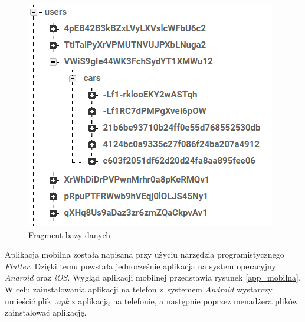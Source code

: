 \documentclass[12pt]{article}
\begin{document}
	\begin{figure}[H]
		\centering
		\includegraphics[scale=1]{baza_danych.png}
		\caption{Fragment bazy danych}
		\label{baza}
	\end{figure}

Aplikacja mobilna została napisana przy użyciu narzędzia programistycznego \textit{Flutter}. Dzięki temu powstała jednocześnie aplikacja na system operacyjny \textit{Android} oraz \textit{iOS}. Wygląd aplikacji mobilnej przedstawia rysunek \ref{app_mobilna}. W celu zainstalowania aplikacji na telefon z~systemem \textit{Android} wystarczy umieścić plik \textit{.apk} z aplikacją na telefonie, a następnie poprzez menadżera plików zainstalować aplikację.
\end{document}

